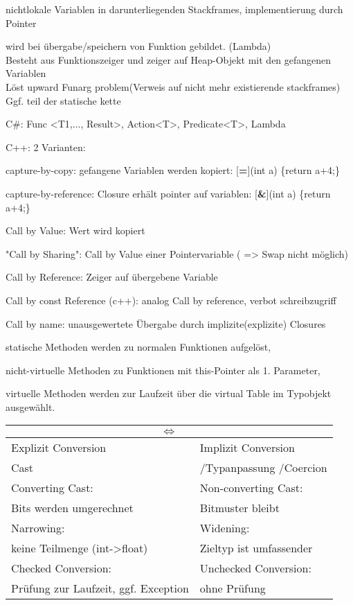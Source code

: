  nichtlokale Variablen in darunterliegenden Stackframes, implementierung durch Pointer

 wird bei übergabe/speichern von Funktion gebildet. (Lambda)\\ 
Besteht aus Funktionszeiger und zeiger auf Heap-Objekt mit den gefangenen Variablen\\
Löst upward Funarg problem(Verweis auf nicht mehr existierende stackframes)\\
Ggf. teil der statische kette

C\#: Func <T1,$\dots$, Result>, Action<T>, Predicate<T>, Lambda

C++: 2 Varianten: 


capture-by-copy: gefangene Variablen werden kopiert: [\textbf{=}](int a) \{return a+4;\}

capture-by-reference: Closure erhält pointer auf variablen: [\textbf{\&}](int a) \{return a+4;\}

Call by Value: Wert wird kopiert

"Call by Sharing": Call by Value einer Pointervariable ( => Swap nicht möglich)

Call by Reference: Zeiger auf übergebene Variable

Call by const Reference (c++): analog Call by reference, verbot schreibzugriff

Call by name: unausgewertete Übergabe durch implizite(explizite) Closures

statische Methoden werden zu normalen Funktionen aufgelöst, 

nicht-virtuelle Methoden zu Funktionen mit this-Pointer als 1. Parameter, 

virtuelle Methoden werden zur Laufzeit über die virtual Table im Typobjekt ausgewählt.



\begin{tabular}{|l|l|}
\hline
\multicolumn{2}{|c|}{$\Leftrightarrow$}\\
\hline
Explizit Conversion  & Implizit Conversion \\
Cast &/Typanpassung /Coercion  \\
\hline
Converting Cast:  & Non-converting Cast: \\
Bits werden umgerechnet & Bitmuster bleibt \\
\hline
Narrowing:  & Widening:  \\
keine Teilmenge (int->float)&Zieltyp ist umfassender\\
\hline
Checked Conversion:   &Unchecked Conversion:  \\
Prüfung zur Laufzeit, ggf. Exception &ohne Prüfung\\
\hline
\end{tabular}

